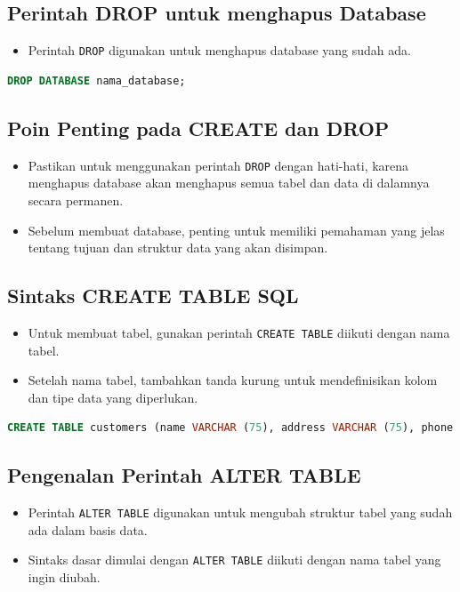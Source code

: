 \documentclass{article}
\begin{document}
\subsection{Perintah DROP untuk menghapus Database}
\begin{itemize}
    \item Perintah \texttt{DROP} digunakan untuk menghapus database yang sudah ada.
\end{itemize}
\begin{lstlisting}[language=SQL, caption={Sintaks DROP DATABASE}, captionpos=b]
DROP DATABASE nama_database;
\end{lstlisting}

\subsection{Poin Penting pada CREATE dan DROP}
\begin{itemize}
    \item Pastikan untuk menggunakan perintah \texttt{DROP} dengan hati-hati, karena menghapus database akan menghapus semua tabel dan data di dalamnya secara permanen.
    \item Sebelum membuat database, penting untuk memiliki pemahaman yang jelas tentang tujuan dan struktur data yang akan disimpan.
\end{itemize}

\subsection{Sintaks CREATE TABLE SQL}
\begin{itemize}
    \item Untuk membuat tabel, gunakan perintah \texttt{CREATE TABLE} diikuti dengan nama tabel.
    \item Setelah nama tabel, tambahkan tanda kurung untuk mendefinisikan kolom dan tipe data yang diperlukan.
\end{itemize}
\begin{lstlisting}[language=SQL, caption={Sintaks CREATE TABLE}, captionpos=b]
CREATE TABLE customers (name VARCHAR (75), address VARCHAR (75), phone VARCHAR (15));
\end{lstlisting}

\subsection{Pengenalan Perintah ALTER TABLE}
\begin{itemize}
    \item Perintah \texttt{ALTER TABLE} digunakan untuk mengubah struktur tabel yang sudah ada dalam basis data.
    \item Sintaks dasar dimulai dengan \texttt{ALTER TABLE} diikuti dengan nama tabel yang ingin diubah.
\end{itemize}
\end{document}
